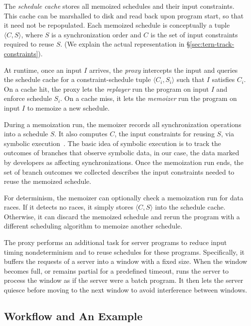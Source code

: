 The \emph{schedule cache} stores all memoized schedules and their input
constraints.  This cache can be marshalled to disk and read back upon
program start, so that it need not be repopulated.
Each memoized schedule
is conceptually a tuple $\langle C, S \rangle$, where $S$ is a
synchronization order and $C$ is the set of input constraints required to reuse
$S$. (We explain the actual representation in
\S\ref{sec:tern-track-constraints}).

At runtime, once an input $I$ arrives, the \emph{proxy} intercepts the
input and queries the schedule cache for a constraint-schedule tuple
$\langle C_i, S_i \rangle$ such that $I$ satisfies $C_i$.  On a cache hit,
the proxy lets the \emph{replayer} run the program on input $I$ and enforce
schedule $S_i$.  On a cache miss, it lets the \emph{memoizer} run the
program on input $I$ to memoize a new schedule.

During a memoization run, the memoizer records all synchronization
operations into a schedule $S$.  It also computes $C$, the input
constraints for reusing $S$, via symbolic execution~\cite{klee:osdi08}.
The basic idea of symbolic execution is to track the outcomes of branches
that observe symbolic data, in our case, the data marked by developers as
affecting synchronizations.  Once the memoization run ends, the set of
branch outcomes we collected describes the input constraints needed to reuse
the memoized schedule.

For determinism, the memoizer can optionally check a memoization run for
data races.  If it detects no races, it simply stores $\langle C, S
\rangle$ into the schedule cache.  Otherwise, it can discard the memoized
schedule and rerun the program with a different scheduling algorithm to
memoize another schedule.

The proxy performs an additional task for server programs to reduce input
timing nondeterminism and to reuse schedules for these programs.
Specifically, it buffers the requests of a server into a window with
a fixed size.
When the window becomes full, or remains partial for a predefined timeout,
\tern runs the server to process the window as if the server were a batch
program.  It then lets the server quiesce before moving to the next window to
avoid interference between windows.

\subsection{Workflow and An Example} \label{sec:tern-example}

